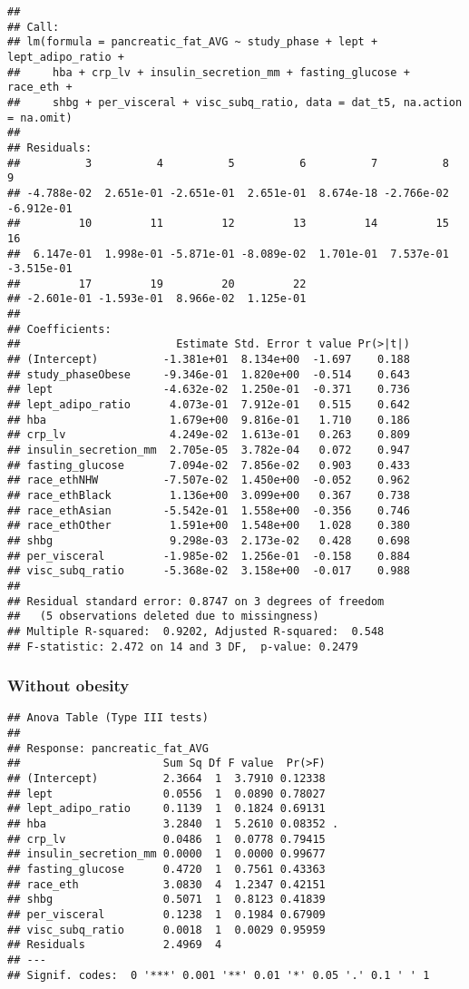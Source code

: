 \documentclass[
]{article}
\begin{document}
\begin{verbatim}
## 
## Call:
## lm(formula = pancreatic_fat_AVG ~ study_phase + lept + lept_adipo_ratio + 
##     hba + crp_lv + insulin_secretion_mm + fasting_glucose + race_eth + 
##     shbg + per_visceral + visc_subq_ratio, data = dat_t5, na.action = na.omit)
## 
## Residuals:
##          3          4          5          6          7          8          9 
## -4.788e-02  2.651e-01 -2.651e-01  2.651e-01  8.674e-18 -2.766e-02 -6.912e-01 
##         10         11         12         13         14         15         16 
##  6.147e-01  1.998e-01 -5.871e-01 -8.089e-02  1.701e-01  7.537e-01 -3.515e-01 
##         17         19         20         22 
## -2.601e-01 -1.593e-01  8.966e-02  1.125e-01 
## 
## Coefficients:
##                        Estimate Std. Error t value Pr(>|t|)
## (Intercept)          -1.381e+01  8.134e+00  -1.697    0.188
## study_phaseObese     -9.346e-01  1.820e+00  -0.514    0.643
## lept                 -4.632e-02  1.250e-01  -0.371    0.736
## lept_adipo_ratio      4.073e-01  7.912e-01   0.515    0.642
## hba                   1.679e+00  9.816e-01   1.710    0.186
## crp_lv                4.249e-02  1.613e-01   0.263    0.809
## insulin_secretion_mm  2.705e-05  3.782e-04   0.072    0.947
## fasting_glucose       7.094e-02  7.856e-02   0.903    0.433
## race_ethNHW          -7.507e-02  1.450e+00  -0.052    0.962
## race_ethBlack         1.136e+00  3.099e+00   0.367    0.738
## race_ethAsian        -5.542e-01  1.558e+00  -0.356    0.746
## race_ethOther         1.591e+00  1.548e+00   1.028    0.380
## shbg                  9.298e-03  2.173e-02   0.428    0.698
## per_visceral         -1.985e-02  1.256e-01  -0.158    0.884
## visc_subq_ratio      -5.368e-02  3.158e+00  -0.017    0.988
## 
## Residual standard error: 0.8747 on 3 degrees of freedom
##   (5 observations deleted due to missingness)
## Multiple R-squared:  0.9202, Adjusted R-squared:  0.548 
## F-statistic: 2.472 on 14 and 3 DF,  p-value: 0.2479
\end{verbatim}

\hypertarget{without-obesity}{%
\subsubsection{Without obesity}\label{without-obesity}}

\begin{verbatim}
## Anova Table (Type III tests)
## 
## Response: pancreatic_fat_AVG
##                      Sum Sq Df F value  Pr(>F)  
## (Intercept)          2.3664  1  3.7910 0.12338  
## lept                 0.0556  1  0.0890 0.78027  
## lept_adipo_ratio     0.1139  1  0.1824 0.69131  
## hba                  3.2840  1  5.2610 0.08352 .
## crp_lv               0.0486  1  0.0778 0.79415  
## insulin_secretion_mm 0.0000  1  0.0000 0.99677  
## fasting_glucose      0.4720  1  0.7561 0.43363  
## race_eth             3.0830  4  1.2347 0.42151  
## shbg                 0.5071  1  0.8123 0.41839  
## per_visceral         0.1238  1  0.1984 0.67909  
## visc_subq_ratio      0.0018  1  0.0029 0.95959  
## Residuals            2.4969  4                  
## ---
## Signif. codes:  0 '***' 0.001 '**' 0.01 '*' 0.05 '.' 0.1 ' ' 1
\end{verbatim}
\end{document}
